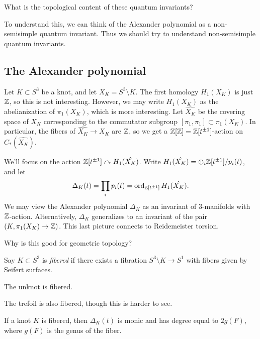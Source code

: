\documentclass{amsart}
\begin{document}
\begin{qn}
  What is the topological content of these quantum invariants?
\end{qn}

To understand this, we can think of the Alexander polynomial as a non-semisimple quantum invariant.
Thus we should try to understand non-semisimple quantum invariants.

\subsection{The Alexander polynomial}

Let $K \subset S^3$ be a knot, and let $X_K = S^3 \setminus K$.
The first homology $H_1(X_K)$ is just $\mathbb{Z}$, so this is not interesting.
However, we may write $H_1(X_K)$ as the abelianization of $\pi_1(X_K)$, which is more interesting.
Let $\hat{X_K}$ be the covering space of $X_K$ corresponding to the commutator subgroup $[\pi_1, \pi_1] \subset \pi_1(X_K)$.
In particular, the fibers of $\hat{X_K} \to X_K$ are $\mathbb{Z}$, so we get a $\mathbb{Z}[\mathbb{Z}] = \mathbb{Z}[t^{\pm 1}]$-action on $C_*(\hat{X_K})$.

We'll focus on the action $\mathbb{Z}[t^{\pm 1}] \curvearrowright H_1(\hat{X_K})$.
Write $H_1(\hat{X_K}) = \oplus_i \mathbb{Z}[t^{\pm 1}] / p_i(t)$, and let
\[
  \Delta_K(t) = \prod_i p_i(t) = \operatorname{ord}_{\mathbb{Z}[t^{\pm 1}]} H_1(\hat{X_K}).
\]
We may view the Alexander polynomial $\Delta_K$ as an invariant of 3-manifolds with $\mathbb{Z}$-action.
Alternatively, $\Delta_K$ generalizes to an invariant of the pair $(K, \pi_1(X_K) \to \mathbb{Z})$.
This last picture connects to Reidemeister torsion.

Why is this good for geometric topology?

\begin{dfn}
  Say $K \subset S^3$ is \emph{fibered} if there exists a fibration $S^3 \setminus K \to S^1$ with fibers given by Seifert surfaces.
\end{dfn}

\begin{ex}
  The unknot is fibered.
\end{ex}

\begin{ex}
  The trefoil is also fibered, though this is harder to see.
\end{ex}

\begin{thm}
  If a knot $K$ is fibered, then $\Delta_K(t)$ is monic and has degree equal to $2 g(F)$, where $g(F)$ is the genus of the fiber.
\end{thm}
\end{document}
